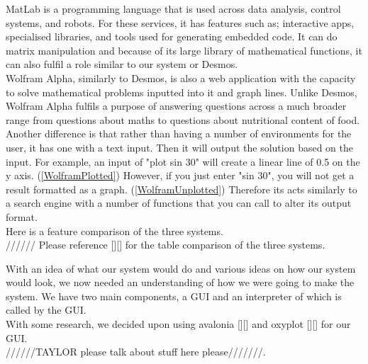 \documentclass[a4paper, oneside, 11pt]{report}
\begin{document}
    MatLab is a programming language that is used across data analysis, control systems, and robots. For these services, it has features such as; interactive apps, specialised libraries, and tools used for generating embedded code. It can do matrix manipulation \citep{Matlab-Feat:2025} and because of its large library of mathematical functions, it can also fulfil a role similar to our system or Desmos. \\

    Wolfram Alpha, similarly to Desmos, is also a web application with the capacity to solve mathematical problems inputted into it and graph lines. Unlike Desmos, Wolfram Alpha fulfils a purpose of answering questions across a much broader range from questions about maths to questions about nutritional content of food. Another difference is that rather than having a number of environments for the user, it has one with a text input. Then it will output the solution based on the input. For example, an input of "plot sin 30" will create a linear line of 0.5 on the y axis. (\ref{WolframPlotted})
    However, if you just enter "sin 30", you will not get a result formatted as a graph. (\ref{WolframUnplotted})
    Therefore its acts similarly to a search engine with a number of functions that you can call to alter its output format. \\

    Here is a feature comparison of the three systems. \\//////
    Please reference [][] for the table comparison of the three systems.

    With an idea of what our system would do and various ideas on how our system would look, we now needed an understanding of how we were going to make the system. We have two main components, a GUI and an interpreter of which is called by the GUI.\\
    With some research, we decided upon using avalonia [][] and oxyplot [][] for our GUI. \\

    //////TAYLOR please talk about stuff here please///////.
\end{document}
